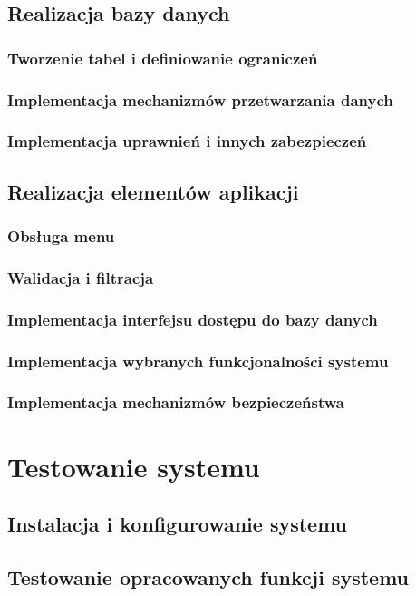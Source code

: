 \documentclass[a4paper, 12pt]{article}
\begin{document}
\subsection{Realizacja bazy danych}
\subsubsection{Tworzenie tabel i definiowanie ograniczeń}
\subsubsection{Implementacja mechanizmów przetwarzania danych}
\subsubsection{Implementacja uprawnień i innych zabezpieczeń}

\subsection{Realizacja elementów aplikacji}
\subsubsection{Obsługa menu}
\subsubsection{Walidacja i filtracja}
\subsubsection{Implementacja interfejsu dostępu do bazy danych}
\subsubsection{Implementacja wybranych funkcjonalności systemu}
\subsubsection{Implementacja mechanizmów bezpieczeństwa}

\section{Testowanie systemu}
\subsection{Instalacja i konfigurowanie systemu}
\subsection{Testowanie opracowanych funkcji systemu}
\end{document}
